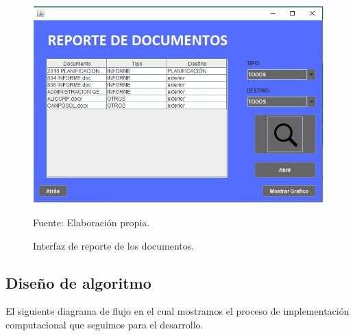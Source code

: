 \begin{figure}[h!]
	\centering
		\includegraphics[scale=0.55]{imagenes/reporteDocumentoss.png}
		\caption{Interfaz de reporte de los documentos.}
		\begin{center}
    Fuente: Elaboración propia.
    \end{center}
	\label{fig:reporteDocumentosCap3}
\end{figure}

\newpage
\subsection{Diseño de algoritmo}

El siguiente diagrama de flujo en el cual mostramos el proceso de implementación computacional que seguimos para el desarrollo.

